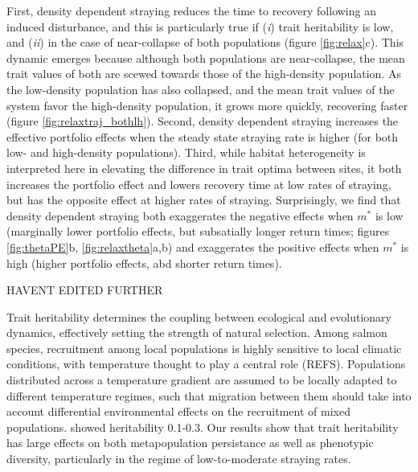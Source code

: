 \documentclass[twocolumn,preprintnumbers,amsmath,amssymb,superscriptaddress]{revtex4}
\begin{document}
First, density dependent straying reduces the time to recovery following an induced disturbance, and this is particularly true if (\emph{i}) trait heritability is low, and (\emph{ii}) in the case of near-collapse of both populations (figure \ref{fig:relax}c).
This dynamic emerges because although both populations are near-collapse, the mean trait values of both are scewed towards those of the high-density population.
As the low-density population has also collapsed, and the mean trait values of the system favor the high-density population, it grows more quickly, recovering faster (figure \ref{fig:relaxtraj_bothlh}).
Second, density dependent straying increases the effective portfolio effects when the steady state straying rate is higher (for both low- and high-density populations).
Third, while habitat heterogeneity is interpreted here in elevating the difference in trait optima between sites, it both increases the portfolio effect and lowers recovery time at low rates of straying, but has the opposite effect at higher rates of straying.
Surprisingly, we find that density dependent straying both exaggerates the negative effects when $m^*$ is low (marginally lower portfolio effects, but subsatially longer return times; figures \ref{fig:thetaPE}b, \ref{fig:relaxtheta}a,b) and exaggerates the positive effects when $m^*$ is high (higher portfolio effects, abd shorter return times). 



HAVENT EDITED FURTHER

Trait heritability determines the coupling between ecological and evolutionary dynamics, effectively setting the strength of natural selection.
Among salmon species, recruitment among local populations is highly sensitive to local climatic conditions, with temperature thought to play a central role (REFS).
Populations distributed across a temperature gradient are assumed to be locally adapted to different temperature regimes, such that migration between them should take into account differential environmental effects on the recruitment of mixed populations.
\citeauthor{Carlson:2008hl} showed heritability 0.1-0.3.
Our results show that trait heritability has large effects on both metapopulation persistance as well as phenotypic diversity, particularly in the regime of low-to-moderate straying rates.




\end{document}
